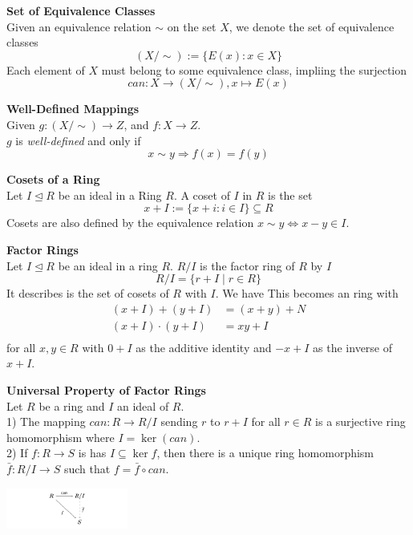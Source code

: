 \documentclass[a4paper, 10pt]{article}
\begin{document}
\begin{multicols*}{3}
\textbf{Set of Equivalence Classes}\\
Given an equivalence relation $\sim$ on the set $X$, we denote the set of equivalence classes
$$
(X / \sim):=\{E(x): x \in X\}
$$
Each element of $X$ must belong to some equivalence class, impliing the surjection
$$can : X \rightarrow(X / \sim), x \mapsto E(x)$$

\textbf{Well-Defined Mappings}\\
Given $g:(X / \sim) \rightarrow Z$, and $f: X \rightarrow Z$. \\
$g$ is \textit{well-defined} and only if $$x \sim y \Rightarrow f(x)=f(y)$$

\textbf{Cosets of a Ring}\\
Let $I \unlhd R$ be an ideal in a Ring $R$. A coset of $I$ in $R$ is the set
$$
x+I:=\{x+i: i \in I\} \subseteq R
$$
Cosets are also defined by the equivalence relation $x \sim y \Leftrightarrow x-y \in I$.

\textbf{Factor Rings}\\
Let $I \unlhd R$ be an ideal in a ring $R$. 
$R / I$ is the factor ring of $R$ by $I$ 
$$R/I = \{r + I \mid r \in R\}$$
It describes is the set of cosets of $R$ with $I$. We have
This becomes an ring with
$$
\begin{aligned}
(x+I) {+}(y+I) & =(x+y)+N \\
(x+I) \cdot(y+I)&=x y+I\\
\end{aligned}
$$
for all $x, y \in R$ with $0+I$ as the additive identity and $-x+I$ as the inverse of $x+I$.

\textbf{Universal Property of Factor Rings}\\
Let $R$ be a ring and $I$ an ideal of $R$.\\
1) The mapping $can : R \rightarrow R / I$ sending $r$ to $r+I$ for all $r \in R$ is a surjective ring homomorphism where $I = \operatorname{ker}(can)$.\\
2) If $f: R \rightarrow S$ is has $I \subseteq \operatorname{ker} f$, then there is a unique ring homomorphism $\bar{f}: R / I \rightarrow S$ such that $f=\bar{f} \circ can$.
\begin{center}
    \includegraphics[width=0.3\textwidth]{Pasted image 20240224112536.png}
\end{center}


\end{multicols*}
\end{document}

